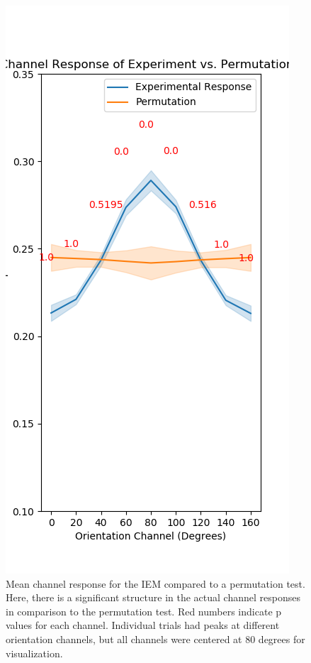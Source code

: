 \documentclass[../main.tex]{subfiles}
\begin{document}
\begin{figure}
    \centering
    \includegraphics[scale=0.7]{figures/results/perm_response.png}
    \caption{Mean channel response for the IEM compared to a permutation test. Here, there is a significant structure in the actual channel responses in comparison to the permutation test. Red numbers indicate p values for each channel. Individual trials had peaks at different orientation channels, but all channels were centered at 80 degrees for visualization.}
    \label{iem_channel_response}
\end{figure}
\end{document}
